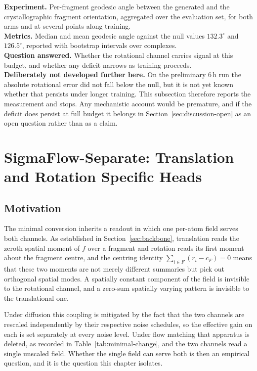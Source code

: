 \documentclass[11pt,a4paper]{report}
\theoremstyle{plain}
\theoremstyle{definition}
\theoremstyle{remark}
\newenvironment{reserved}[1]{%
    \begin{tcolorbox}[
      enhanced, breakable,
      colback=PanelGrey, colframe=DraftBlue,
      boxrule=0.5pt, left=6pt,right=6pt,top=5pt,bottom=5pt,
      fonttitle=\bfseries\small\sffamily,
      title={RESERVED \textendash\ #1}]
      \small\sffamily
  }{%
    \end{tcolorbox}
  }
\newenvironment{reserved}[1]{\setbox0=\vbox\bgroup}{\egroup}
\newcommand{\Ang}[1]{\ensuremath{#1^{\circ}}}
\begin{document}
\begin{reserved}{Rotational error against the Haar null}
\textbf{Experiment.} Per-fragment geodesic angle between the generated and the
crystallographic fragment orientation, aggregated over the evaluation set, for
both arms and at several points along training.\\
\textbf{Metrics.} Median and mean geodesic angle against the null values
$\Ang{132.3}$ and $\Ang{126.5}$, reported with bootstrap intervals over
complexes.\\
\textbf{Question answered.} Whether the rotational channel carries signal at
this budget, and whether any deficit narrows as training proceeds.\\
\textbf{Deliberately not developed further here.} On the preliminary $6$\,h run
the absolute rotational error did not fall below the null, but it is not yet
known whether that persists under longer training. This subsection therefore
reports the measurement and stops. Any mechanistic account would be premature,
and if the deficit does persist at full budget it belongs in
Section~\ref{sec:discussion-open} as an open question rather than as a claim.
\end{reserved}

\chapter{SigmaFlow-Separate: Translation and Rotation Specific Heads}
\label{ch:separate}

\section{Motivation}

The minimal conversion inherits a readout in which one per-atom field serves
both channels. As established in Section~\ref{sec:backbone}, translation reads
the zeroth spatial moment of $f$ over a fragment and rotation reads its first
moment about the fragment centre, and the centring identity
$\sum_{i\in F}(r_i - c_F) = 0$ means that these two moments are not merely
different summaries but pick out orthogonal spatial modes. A spatially constant
component of the field is invisible to the rotational channel, and a
zero-sum spatially varying pattern is invisible to the translational one.

Under diffusion this coupling is mitigated by the fact that the two channels
are rescaled independently by their respective noise schedules, so the
effective gain on each is set separately at every noise level. Under flow
matching that apparatus is deleted, as recorded in
Table~\ref{tab:minimal-change}, and the two channels read a single unscaled
field. Whether the single field can serve both is then an empirical question,
and it is the question this chapter isolates.
\end{document}
